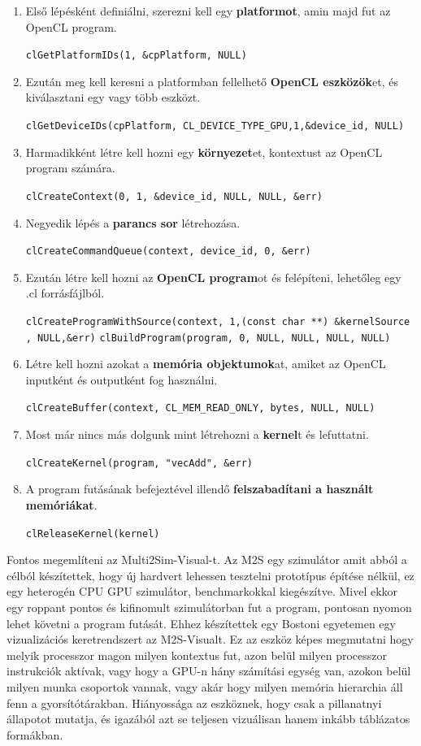 \begin{enumerate}
\item Első lépésként definiálni, szerezni kell egy \textbf{platformot}, amin majd fut az OpenCL program. 

\texttt{clGetPlatformIDs(1, \&cpPlatform, NULL)}
\item Ezután meg kell keresni a platformban fellelhető \textbf{OpenCL eszközök}et, és kiválasztani egy vagy több eszközt.

\texttt{clGetDeviceIDs(cpPlatform, CL\_DEVICE\_TYPE\_GPU,1,\&device\_id, NULL)}
\item Harmadikként létre kell hozni egy \textbf{környezet}et, kontextust az OpenCL program számára.

\texttt{clCreateContext(0, 1, \&device\_id, NULL, NULL, \&err)}
\item Negyedik lépés a \textbf{parancs sor} létrehozása.

\texttt{clCreateCommandQueue(context, device\_id, 0, \&err)}
\item Ezután létre kell hozni az \textbf{OpenCL program}ot és felépíteni, lehetőleg egy .cl forrásfájlból.

\texttt{clCreateProgramWithSource(context, 1,(const char **) \&kernelSource\\ , NULL,\&err)}
\newline
\texttt{clBuildProgram(program, 0, NULL, NULL, NULL, NULL)}
\item Létre kell hozni azokat a \textbf{memória objektumok}at, amiket az OpenCL inputként és outputként fog használni.

\texttt{clCreateBuffer(context, CL\_MEM\_READ\_ONLY, bytes, NULL, NULL)}
\item Most már nincs más dolgunk mint létrehozni a \textbf{kernel}t és lefuttatni.

\texttt{clCreateKernel(program, "vecAdd", \&err)}
\item A program futásának befejeztével illendő \textbf{felszabadítani a használt memóriákat}.

\texttt{clReleaseKernel(kernel)}
\end{enumerate}
	
Fontos megemlíteni az Multi2Sim-Visual-t. Az M2S egy szimulátor amit abból a célból készítettek, hogy új hardvert lehessen tesztelni prototípus építése nélkül, ez egy heterogén CPU GPU szimulátor, benchmarkokkal kiegészítve. Mivel ekkor egy roppant pontos és kifinomult szimulátorban fut a program, pontosan nyomon lehet követni a program futását. Ehhez készítettek egy Bostoni egyetemen egy vizualizációs keretrendszert az M2S-Visualt. Ez az eszköz képes megmutatni hogy melyik processzor magon milyen kontextus fut, azon belül milyen processzor instrukciók aktívak, vagy hogy a GPU-n hány számítási egység van, azokon belül milyen munka csoportok vannak, vagy akár hogy milyen memória hierarchia áll fenn a gyorsítótárakban.
Hiányossága az eszköznek, hogy csak a pillanatnyi állapotot mutatja, és igazából azt se teljesen vizuálisan hanem inkább táblázatos formákban.

